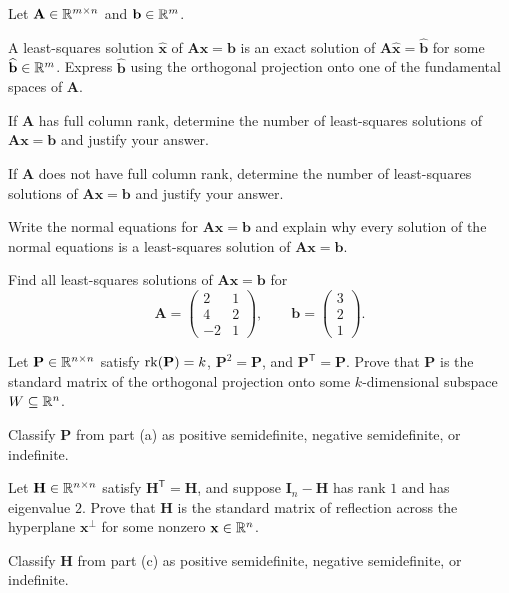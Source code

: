 \begin{problem}
Let $\mathbf A\in\mathbb{R}^{m\times n}$ and $\mathbf b\in\mathbb{R}^m$.
\begin{problemsubparts}
\item A least-squares solution $\widehat{\mathbf x}$ of $\mathbf A\mathbf x=\mathbf b$ is an exact solution of $\mathbf A\widehat{\mathbf x}=\widehat{\mathbf b}$ for some $\widehat{\mathbf b}\in\mathbb{R}^m$. Express $\widehat{\mathbf b}$ using the orthogonal projection onto one of the fundamental spaces of $\mathbf A$.
\item If $\mathbf A$ has full column rank, determine the number of least-squares solutions of $\mathbf A\mathbf x=\mathbf b$ and justify your answer.
\item If $\mathbf A$ does not have full column rank, determine the number of least-squares solutions of $\mathbf A\mathbf x=\mathbf b$ and justify your answer.
\item Write the normal equations for $\mathbf A\mathbf x=\mathbf b$ and explain why every solution of the normal equations is a least-squares solution of $\mathbf A\mathbf x=\mathbf b$.
\item Find all least-squares solutions of $\mathbf A\mathbf x=\mathbf b$ for
\[
\mathbf A=
\begin{pmatrix}
2&1\\
4&2\\
-2&1
\end{pmatrix},
\qquad
\mathbf b=\begin{pmatrix}3\\2\\1\end{pmatrix}.
\]
\end{problemsubparts}
\end{problem}

\begin{problem}
\begin{problemsubparts}
\item Let $\mathbf P\in\mathbb{R}^{n\times n}$ satisfy $\operatorname{rk}(\mathbf P)=k$, $\mathbf P^2=\mathbf P$, and $\mathbf P^{\mathsf T}=\mathbf P$. Prove that $\mathbf P$ is the standard matrix of the orthogonal projection onto some $k$-dimensional subspace $W\subseteq\mathbb{R}^n$.
\item Classify $\mathbf P$ from part \textup{(a)} as positive semidefinite, negative semidefinite, or indefinite.
\item Let $\mathbf H\in\mathbb{R}^{n\times n}$ satisfy $\mathbf H^{\mathsf T}=\mathbf H$, and suppose $\mathbf I_n-\mathbf H$ has rank $1$ and has eigenvalue $2$. Prove that $\mathbf H$ is the standard matrix of reflection across the hyperplane $\mathbf x^\perp$ for some nonzero $\mathbf x\in\mathbb{R}^n$.
\item Classify $\mathbf H$ from part \textup{(c)} as positive semidefinite, negative semidefinite, or indefinite.
\end{problemsubparts}
\end{problem}

